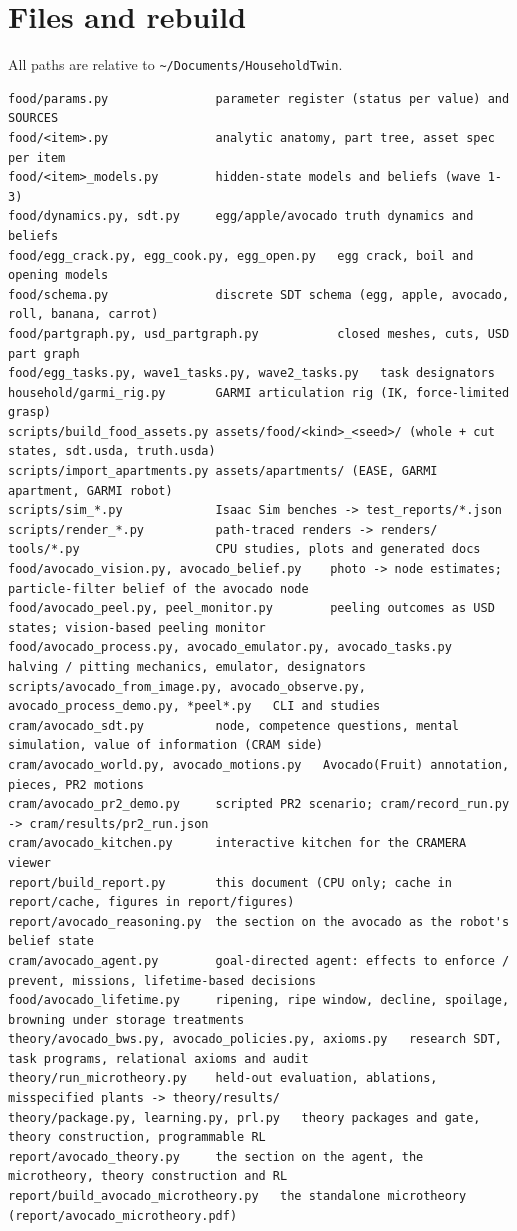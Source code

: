\documentclass[10.5pt,a4paper]{article}
\begin{document}
\section{Files and rebuild}
All paths are relative to \texttt{\textasciitilde/Documents/HouseholdTwin}.
\begin{Verbatim}[fontsize=\scriptsize,frame=lines]
food/params.py               parameter register (status per value) and SOURCES
food/<item>.py               analytic anatomy, part tree, asset spec per item
food/<item>_models.py        hidden-state models and beliefs (wave 1-3)
food/dynamics.py, sdt.py     egg/apple/avocado truth dynamics and beliefs
food/egg_crack.py, egg_cook.py, egg_open.py   egg crack, boil and opening models
food/schema.py               discrete SDT schema (egg, apple, avocado, roll, banana, carrot)
food/partgraph.py, usd_partgraph.py           closed meshes, cuts, USD part graph
food/egg_tasks.py, wave1_tasks.py, wave2_tasks.py   task designators
household/garmi_rig.py       GARMI articulation rig (IK, force-limited grasp)
scripts/build_food_assets.py assets/food/<kind>_<seed>/ (whole + cut states, sdt.usda, truth.usda)
scripts/import_apartments.py assets/apartments/ (EASE, GARMI apartment, GARMI robot)
scripts/sim_*.py             Isaac Sim benches -> test_reports/*.json
scripts/render_*.py          path-traced renders -> renders/
tools/*.py                   CPU studies, plots and generated docs
food/avocado_vision.py, avocado_belief.py    photo -> node estimates; particle-filter belief of the avocado node
food/avocado_peel.py, peel_monitor.py        peeling outcomes as USD states; vision-based peeling monitor
food/avocado_process.py, avocado_emulator.py, avocado_tasks.py   halving / pitting mechanics, emulator, designators
scripts/avocado_from_image.py, avocado_observe.py, avocado_process_demo.py, *peel*.py   CLI and studies
cram/avocado_sdt.py          node, competence questions, mental simulation, value of information (CRAM side)
cram/avocado_world.py, avocado_motions.py   Avocado(Fruit) annotation, pieces, PR2 motions
cram/avocado_pr2_demo.py     scripted PR2 scenario; cram/record_run.py -> cram/results/pr2_run.json
cram/avocado_kitchen.py      interactive kitchen for the CRAMERA viewer
report/build_report.py       this document (CPU only; cache in report/cache, figures in report/figures)
report/avocado_reasoning.py  the section on the avocado as the robot's belief state
cram/avocado_agent.py        goal-directed agent: effects to enforce / prevent, missions, lifetime-based decisions
food/avocado_lifetime.py     ripening, ripe window, decline, spoilage, browning under storage treatments
theory/avocado_bws.py, avocado_policies.py, axioms.py   research SDT, task programs, relational axioms and audit
theory/run_microtheory.py    held-out evaluation, ablations, misspecified plants -> theory/results/
theory/package.py, learning.py, prl.py   theory packages and gate, theory construction, programmable RL
report/avocado_theory.py     the section on the agent, the microtheory, theory construction and RL
report/build_avocado_microtheory.py   the standalone microtheory (report/avocado_microtheory.pdf)


\end{Verbatim}
\end{document}
